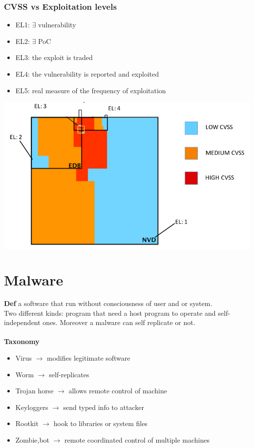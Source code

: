 \documentclass[10pt,a4paper]{book}
\begin{document}
\subsection{CVSS vs Exploitation levels}
\begin{itemize}
\item EL1: $\exists$ vulnerability 
\item EL2: $\exists$ PoC 
\item EL3: the exploit is traded
\item EL4: the vulnerability is reported and exploited
\item EL5: real measure of the frequency of exploitation
\end{itemize}
\includegraphics[scale=0.5]{img/comparison.png}


\chapter{Malware}
\textbf{Def} a software that run without consciousness of user and or system.\\
Two different kinds: program that need a host program to operate and self-independent ones. Moreover a malware can self replicate or not.\\\\
\textbf{Taxonomy}
\begin{itemize}
\item Virus $\to$ modifies legitimate software
\item Worm $\to$ self-replicates
\item Trojan horse $\to$ allows remote control of machine
\item Keyloggers $\to$ send typed info to attacker
\item Rootkit $\to$ hook to libraries or system files
\item Zombie,bot $\to$ remote coordinated control of multiple machines
\end{itemize}
\end{document}
